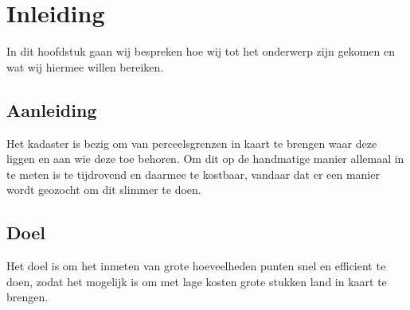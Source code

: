 \section{Inleiding}
In dit hoofdstuk gaan wij bespreken hoe wij tot het onderwerp zijn gekomen en wat wij 
hiermee willen bereiken.

\subsection{Aanleiding}
Het kadaster is bezig om van perceelsgrenzen in kaart te brengen waar deze liggen 
en aan wie deze toe behoren. Om dit op de handmatige manier allemaal in te meten is 
te tijdrovend en daarmee te kostbaar, vandaar dat er een manier wordt geozocht om dit 
slimmer te doen.


\subsection{Doel}
Het doel is om het inmeten van grote hoeveelheden punten snel en efficient te doen, 
zodat het mogelijk is om met lage kosten grote stukken land in kaart te brengen.